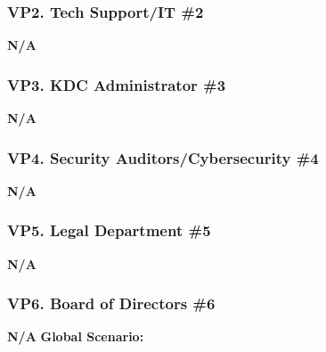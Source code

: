 \documentclass[]{article}
\begin{document}
\subsubsection*{VP2. Tech Support/IT \#2}
\textbf{N/A}
\subsubsection*{VP3. KDC Administrator \#3}
\textbf{N/A}
\subsubsection*{VP4. Security Auditors/Cybersecurity \#4}
\textbf{N/A}
\subsubsection*{VP5. Legal Department \#5}
\textbf{N/A}
\subsubsection*{VP6. Board of Directors \#6}
\textbf{N/A}\newline\newline
\textbf{Global Scenario:}
\end{document}
